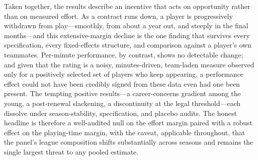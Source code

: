 Taken together, the results describe an incentive that acts on opportunity
rather than on measured effort. As a contract runs down, a player is
progressively withdrawn from play---smoothly, from about a year out, and steeply
in the final months---and this extensive-margin decline is the one finding that
survives every specification, every fixed-effects structure, and comparison
against a player's own teammates. Per-minute performance, by contrast, shows no
detectable change; and given that the rating is a noisy, minutes-driven,
team-laden measure observed only for a positively selected set of players who
keep appearing, a performance effect could not have been credibly signed from
these data even had one been present. The tempting positive results---a
career-concerns gradient among the young, a post-renewal slackening, a
discontinuity at the legal threshold---each dissolve under season-stability,
specification, and placebo audits. The honest headline is therefore a
well-audited null on the effort margin paired with a robust effect on the
playing-time margin, with the caveat, applicable throughout, that the panel's
league composition shifts substantially across seasons and remains the single
largest threat to any pooled estimate.
